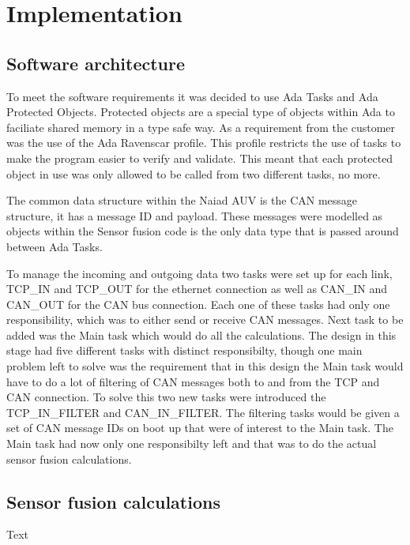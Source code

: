 \section{Implementation}\label{sec:implementation}
\subsection{Software architecture}
To meet the software requirements it was decided to use Ada Tasks and Ada
Protected Objects. Protected objects are a special type of objects within Ada
to faciliate shared memory in a type safe way. As a requirement from the
customer was the use of the Ada Ravenscar profile. This profile restricts
the use of tasks to make the program easier to verify and validate. This meant
that each protected object in use was only allowed to be called from two
different tasks, no more.

The common data structure within the Naiad AUV is the CAN message structure,
it has a message ID and payload. These messages were modelled as objects within
the Sensor fusion code is the only data type that is passed around between
Ada Tasks.

To manage the incoming and outgoing data two tasks were set up for each link,
TCP\_IN and TCP\_OUT for the ethernet connection as well as CAN\_IN and CAN\_OUT for
the CAN bus connection. Each one of these tasks had only one responsibility, which
was to either send or receive CAN messages. Next task to be added was the Main
task which would do all the calculations. The design in this stage had five
different tasks with distinct responsibilty, though one main problem left to solve
was the requirement that in this design the Main task would have to do a lot of
filtering of CAN messages both to and from the TCP and CAN connection. To solve this
two new tasks were introduced the TCP\_IN\_FILTER and CAN\_IN\_FILTER. The filtering
tasks would be given a set of CAN message IDs on boot up that were of interest to
the Main task. The Main task had now only one responsibilty left and that was
to do the actual sensor fusion calculations.

\subsection{Sensor fusion calculations}
Text

